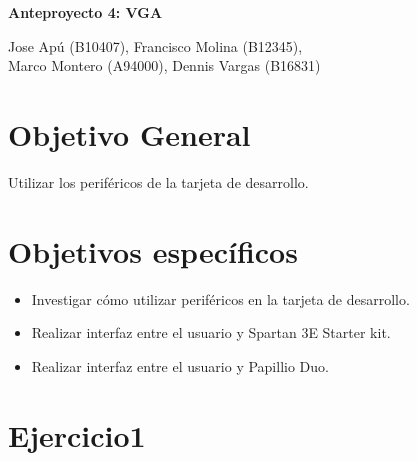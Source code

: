 \documentclass[10pt]{article}
\begin{document}
\begin{huge}
\begin{center}
\textbf{Anteproyecto 4: VGA}
\end{center}
\end{huge}

\begin{Large}
\begin{center}
Jose Apú (B10407), Francisco Molina (B12345), \\Marco Montero (A94000), Dennis Vargas (B16831)
\end{center}
\end{Large}

\section*{Objetivo General}
Utilizar los periféricos de la tarjeta de desarrollo.

\section*{Objetivos específicos}
\begin{itemize}
\item Investigar cómo utilizar periféricos en la tarjeta de desarrollo.
\item Realizar interfaz entre el usuario y Spartan 3E Starter kit.
\item Realizar interfaz entre el usuario y Papillio Duo.

\end{itemize}

\newpage

\section*{Ejercicio1}
\end{document}
